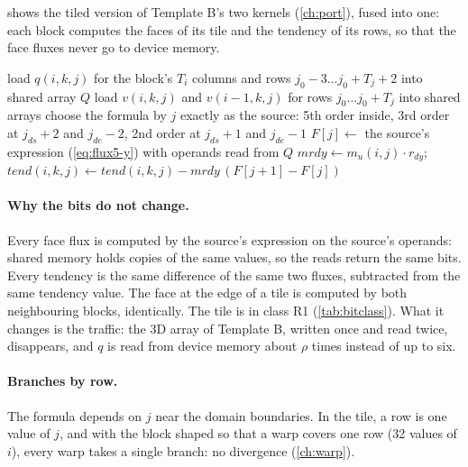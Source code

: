  shows the tiled version of Template B's two kernels (\cref{ch:port}), fused into one: each block
computes the faces of its tile and the tendency of its rows, so that the face fluxes never go to device memory.

\begin{algorithm}[ht]
\caption{Tiled 5th-order $y$-flux and its divergence for one level $k$ (CUDA Fortran sketch of phase S6-11.1). Block
size $T_i \times T_j$ threads; tile rows $j_0 \ldots j_0 + T_j - 1$.}
\label{alg:tile-flux}
\begin{algorithmic}[1]
\State load $q(i, k, j)$ for the block's $T_i$ columns and rows $j_0 - 3 \ldots j_0 + T_j + 2$ into shared array $Q$
\State load $v(i, k, j)$ and $v(i-1, k, j)$ for rows $j_0 \ldots j_0 + T_j$ into shared arrays
\State {}
  \State choose the formula by $j$ exactly as the source: 5th order inside, 3rd order at $j_{ds}+2$ and
    $j_{de}-2$, 2nd order at $j_{ds}+1$ and $j_{de}-1$
  \State $F[j] \gets$ the source's expression (\cref{eq:flux5-y}) with operands read from $Q$
\EndFor
\State {}
  \State $\mathit{mrdy} \gets m_{u}(i, j)\cdot r_{dy}$; \quad $\mathit{tend}(i,k,j) \gets \mathit{tend}(i,k,j) - \mathit{mrdy}\,(F[j+1] - F[j])$
\EndFor
\end{algorithmic}
\end{algorithm}

\paragraph{Why the bits do not change.} Every face flux is computed by the source's expression on the source's operands:
shared memory holds copies of the same values, so the reads return the same bits. Every tendency is the same
difference of the same two fluxes, subtracted from the same tendency value. The face at the edge of a tile is computed
by both neighbouring blocks, identically. The tile is in class R1 (\cref{tab:bitclass}). What it changes is the
traffic: the 3D array  of Template B, written once and read twice, disappears, and $q$ is read from device
memory about $\rho$ times instead of up to six.

\paragraph{Branches by row.} The formula depends on $j$ near the domain boundaries. In the tile, a row is one value of
$j$, and with the block shaped so that a warp covers one row (32 values of $i$), every warp takes a single branch: no
divergence (\cref{ch:warp}).

